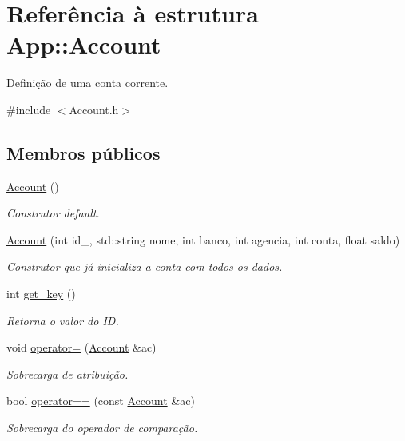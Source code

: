 \hypertarget{structApp_1_1Account}{}\section{Referência à estrutura App\+:\+:Account}
\label{structApp_1_1Account}


Definição de uma conta corrente.  




{\ttfamily \#include $<$Account.\+h$>$}

\subsection*{Membros públicos}
\begin{DoxyCompactItemize}
\item 
\hyperlink{structApp_1_1Account_aa14ee6213993d18e3c29be2cfe7648a9}{Account} ()
\begin{DoxyCompactList}\small\item\em Construtor default. \end{DoxyCompactList}\item 
\hyperlink{structApp_1_1Account_a3f78b7dfeb49586fa19a00a29f1cbd5a}{Account} (int id\+\_\+, std\+::string nome, int banco, int agencia, int conta, float saldo)
\begin{DoxyCompactList}\small\item\em Construtor que já inicializa a conta com todos os dados. \end{DoxyCompactList}\item 
int \hyperlink{structApp_1_1Account_a9650caf273e6d33093e1270c2a7d6bab}{get\+\_\+key} ()
\begin{DoxyCompactList}\small\item\em Retorna o valor do ID. \end{DoxyCompactList}\item 
void \hyperlink{structApp_1_1Account_a662309c8c316a9b0504b16f042444b19}{operator=} (\hyperlink{structApp_1_1Account}{Account} \&ac)
\begin{DoxyCompactList}\small\item\em Sobrecarga de atribuição. \end{DoxyCompactList}\item 
bool \hyperlink{structApp_1_1Account_ab4927822154c84318aa051cc104748fa}{operator==} (const \hyperlink{structApp_1_1Account}{Account} \&ac)
\begin{DoxyCompactList}\small\item\em Sobrecarga do operador de comparação. \end{DoxyCompactList}\end{DoxyCompactItemize}
